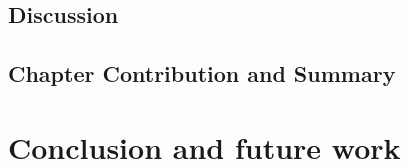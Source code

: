 \documentclass[10pt,letterpaper,twoside,openright]{book}
\begin{document}
\newpage

\section{Discussion}

\newpage

\section{Chapter Contribution and Summary}

\newpage

\chapter{Conclusion and future work}~\label{ch:conclusion}

\newpage



\end{document}
